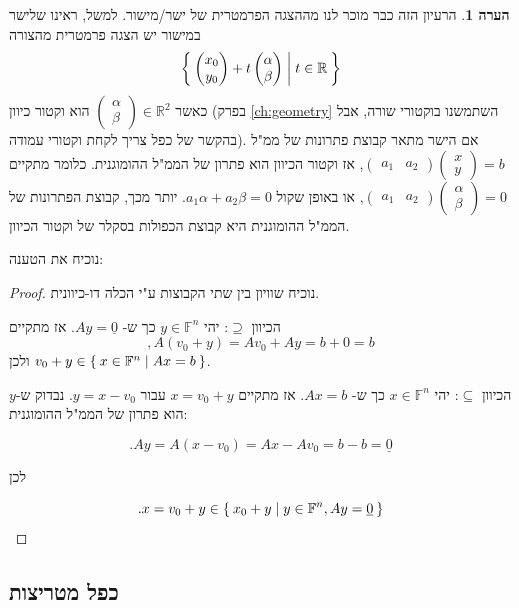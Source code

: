 \documentclass[12pt]{report}
\theoremstyle{plain}
\theoremstyle{definition}
\newtheorem{remark}{הערה}[chapter]
\newcommand{\R}{\mathbb{R}}
\newcommand{\F}{\mathbb{F}}
\newcommand{\0}{\mathbf{0}}
\begin{document}
\begin{remark}
הרעיון הזה כבר מוכר לנו מההצגה הפרמטרית של ישר/מישור. למשל, ראינו שלישר במישור יש הצגה פרמטרית מהצורה
$$
\Set{\begin{pmatrix}
x_0 \\
y_0 
\end{pmatrix}+t\begin{pmatrix}
\alpha \\
\beta
\end{pmatrix}|t\in\R}
$$
כאשר
$\begin{pmatrix}
\alpha \\
\beta
\end{pmatrix}\in\R^2$
הוא וקטור כיוון (בפרק 
\ref{ch:geometry}
השתמשנו בוקטורי שורה, אבל בהקשר של כפל צריך לקחת וקטורי עמודה). אם הישר מתאר קבוצת פתרונות של ממ"ל
$\begin{pmatrix}a_1 &a_2\end{pmatrix}\begin{pmatrix}
x \\
y 
\end{pmatrix}=b$,
אז וקטור הכיוון הוא פתרון של הממ"ל ההומוגנית. כלומר מתקיים
$\begin{pmatrix}a_1 &a_2\end{pmatrix}\begin{pmatrix}
\alpha \\
\beta
\end{pmatrix}=0$,
או באופן שקול
$a_1\alpha+a_2\beta=0$.
יותר מכך, קבוצת הפתרונות של הממ"ל ההומוגנית היא קבוצת הכפולות בסקלר של וקטור הכיוון.
\end{remark}

נוכיח את הטענה:

\begin{proof}
נוכיח שוויון בין שתי הקבוצות ע"י הכלה דו-כיוונית.

הכיוון
$\supseteq$:
יהי 
$y\in\F^n$
כך ש-
$Ay=\underline{0}$.
אז מתקיים
$$
,A(v_0+y)=Av_0+Ay=b+0=b
$$
ולכן
$v_0+y\in\Set{x\in\F^n|Ax=b}$.

הכיוון
$\subseteq$:
יהי 
$x\in\F^n$
כך ש-
$Ax=b$.
אז מתקיים
$x=v_0+y$
עבור
$y=x-v_0$.
נבדוק ש-$y$
הוא פתרון של הממ"ל ההומוגנית:

$$
.Ay=A(x-v_0)=Ax-Av_0=b-b=\underline{0}
$$

לכן

$$
.x=v_0+y\in\Set{x_0+y|y\in\F^n,Ay=\underline{0}}
$$

\end{proof}

\subsection{כפל מטריצות}
\end{document}
